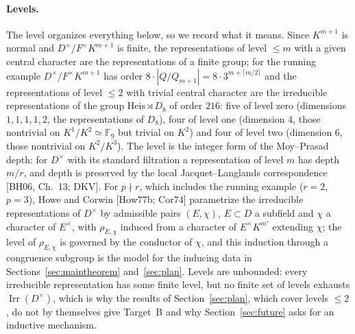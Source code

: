 \documentclass[11pt]{article}
\newcommand{\Fq}{\mathbb F}
\newcommand{\Irr}{\operatorname{Irr}}
\theoremstyle{plain}
\theoremstyle{definition}
\begin{document}
\paragraph{Levels.}  The level organizes everything below, so we
record what it means.  Since $K^{m+1}$ is normal and
$D^\times/F^\times K^{m+1}$ is finite, the representations of level
$\le m$ with a given central character are the representations of a
finite group; for the running example $D^\times/F^\times K^{m+1}$ has
order $8\cdot|Q/Q_{m+1}|=8\cdot3^{m+\lceil m/2\rceil}$ and the
representations of level $\le2$ with trivial central character are the
irreducible representations of the group $\mathrm{Heis}\rtimes D_8$ of
order $216$: five of level zero (dimensions $1,1,1,1,2$, the
representations of $D_8$), four of level one (dimension $4$, those
nontrivial on $K^1/K^2\simeq\Fq_9$ but trivial on $K^2$) and four of
level two (dimension $6$, those nontrivial on $K^2/K^3$).  The level is
the integer form of the Moy--Prasad depth: for $D^\times$ with its
standard filtration a representation of level $m$ has depth $m/r$, and
depth is preserved by the local Jacquet--Langlands correspondence
[BH06, Ch.~13; DKV].  For $p\nmid r$, which includes the running
example ($r=2$, $p=3$), Howe and Corwin [How77b; Cor74] parametrize the
irreducible representations of $D^\times$ by admissible pairs $(E,\chi)$,
$E\subset D$ a subfield and $\chi$ a character of $E^\times$, with
$\rho_{E,\chi}$ induced from a character of $E^\times K^{m'}$ extending
$\chi$; the level of $\rho_{E,\chi}$ is governed by the conductor of
$\chi$, and this induction through a congruence subgroup is the model
for the inducing data in Sections~\ref{sec:maintheorem}
and~\ref{sec:plan}.  Levels are unbounded: every irreducible
representation has some finite level, but no finite set of levels
exhausts $\Irr(D^\times)$, which is why the results of
Section~\ref{sec:plan}, which cover levels $\le2$, do not by themselves
give Target~B and why Section~\ref{sec:future} asks for an inductive
mechanism.
\end{document}
